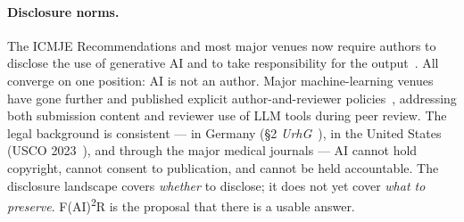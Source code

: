 \paragraph{Disclosure norms.}
The \textsc{ICMJE} Recommendations and most major venues now require
authors to disclose the use of generative AI and to take
responsibility for the output~\cite{icmje2023}. All converge on one
position: AI is not an author. Major machine-learning venues have
gone further and published explicit author-and-reviewer
policies~\cite{neurips_llm_policy,iclr_llm_policy,aclrr_llm_policy},
addressing both submission content and reviewer use of LLM tools
during peer review. The legal background is consistent --- in
Germany (\S2 \emph{UrhG}~\cite{urhg2}), in the
United States (USCO 2023~\cite{usco2023ai}),
and through the major medical journals --- AI cannot hold copyright,
cannot consent to publication, and cannot be held accountable. The
disclosure landscape covers \emph{whether} to disclose; it does not
yet cover \emph{what to preserve}. F(AI)\textsuperscript{2}R is the
proposal that there is a usable answer.
